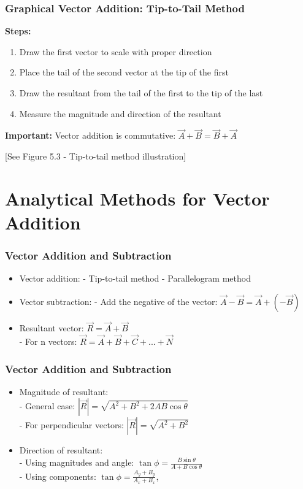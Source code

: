 \documentclass{beamer}
\begin{document}
\begin{frame}
\frametitle{Graphical Vector Addition: Tip-to-Tail Method}
\textbf{Steps:}
\pause
\begin{enumerate}
    \item Draw the first vector to scale with proper direction \pause
    \item Place the tail of the second vector at the tip of the first \pause
    \item Draw the resultant from the tail of the first to the tip of the last \pause
    \item Measure the magnitude and direction of the resultant
\end{enumerate}
\pause
\vspace{0.3cm}
\textbf{Important:} Vector addition is commutative: $\vec{A} + \vec{B} = \vec{B} + \vec{A}$

\vspace{0.2cm}
\alert{[See Figure 5.3 - Tip-to-tail method illustration]}
\end{frame}

\section{Analytical Methods for Vector Addition}

\begin{frame}
\frametitle{Vector Addition and Subtraction}
\begin{itemize}
    \item Vector addition:
- Tip-to-tail method
- Parallelogram method

\item Vector subtraction:
- Add the negative of the vector: $\vec{A} - \vec{B} = \vec{A} + (-\vec{B})$

\item Resultant vector: $\vec{R} = \vec{A} + \vec{B}$
 \\
- For n vectors: $\vec{R} = \vec{A} + \vec{B} + \vec{C} + ... + \vec{N}$
\end{itemize}
\end{frame}

\begin{frame}
\frametitle{Vector Addition and Subtraction}
\begin{itemize}
\item Magnitude of resultant:\\
- General case: $|\vec{R}| = \sqrt{A^2 + B^2 + 2AB\cos\theta}$\\
- For perpendicular vectors: $|\vec{R}| = \sqrt{A^2 + B^2}$

\item Direction of resultant:\\
- Using magnitudes and angle: $\tan\phi = \frac{B\sin\theta}{A + B\cos\theta}$\\
- Using components: $\tan\phi = \frac{A_y + B_y}{A_x + B_x}$, 

\end{itemize}
\end{frame}
\end{document}
